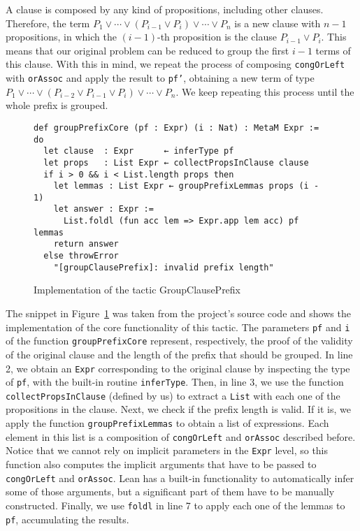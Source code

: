 A clause is composed by any kind of propositions, including other clauses.
Therefore, the term $P_{1} \vee \cdots \vee (P_{i - 1} \vee P_{i}) \vee \cdots \vee P_{n}$ is a new clause
with $n - 1$ propositions, in which the $(i - 1)$-th proposition is the clause
$P_{i - 1} \vee P_{i}$. This means that our original problem can be reduced to
group the first $i - 1$ terms of this clause.
With this in mind, we repeat the process of composing \texttt{congOrLeft} with
\texttt{orAssoc} and apply the result to \texttt{pf'}, obtaining
a new term of type $P_{1} \vee \cdots \vee (P_{i - 2} \vee P_{i - 1} \vee P_{i}) \vee \cdots \vee P_{n}$.
We keep repeating this process until the whole prefix is grouped.


\begin{figure}[t]
\begin{verbatim}
def groupPrefixCore (pf : Expr) (i : Nat) : MetaM Expr := do
  let clause  : Expr      ← inferType pf
  let props   : List Expr ← collectPropsInClause clause
  if i > 0 && i < List.length props then
    let lemmas : List Expr ← groupPrefixLemmas props (i - 1)
    let answer : Expr :=
      List.foldl (fun acc lem => Expr.app lem acc) pf lemmas
    return answer
  else throwError
    "[groupClausePrefix]: invalid prefix length"
\end{verbatim}
\caption{Implementation of the tactic GroupClausePrefix}\label{groupClause}
\end{figure}

The snippet in Figure~\ref{groupClause} was taken from the project's source code and shows the
implementation of the core functionality of this tactic.
The parameters \texttt{pf} and \texttt{i} of the function \texttt{groupPrefixCore}
represent, respectively, the proof of the validity of the original clause
and the length of the prefix that should be grouped. In line 2, we obtain
an \texttt{Expr} corresponding to the original clause by inspecting the type
of \texttt{pf}, with the built-in routine \texttt{inferType}. Then, in line 3,
we use the function \texttt{collectPropsInClause} (defined by us) to
extract a \texttt{List} with each one of the propositions in the clause.
Next, we check if the prefix length is valid. If it is, we apply the function
\texttt{groupPrefixLemmas} to obtain a list of expressions. Each element in this list
is a composition of \texttt{congOrLeft} and \texttt{orAssoc} described before.
Notice that we cannot rely on implicit parameters in the \texttt{Expr} level, so
this function also computes the implicit arguments that have to be
passed to \texttt{congOrLeft} and \texttt{orAssoc}. Lean has a built-in
functionality to automatically infer some of those arguments, but a significant
part of them have to be manually constructed. Finally, we use \texttt{foldl}
in line 7 to apply each one of the lemmas to \texttt{pf}, accumulating the results.

